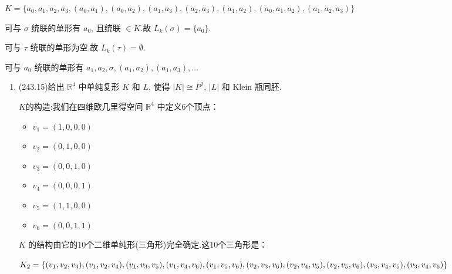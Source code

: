 \begin{enumerate}
\begin{proofc}[解答]
\begin{itemize}
    $K = \{ a_0, a_1, a_2, a_3, (a_0, a_1), (a_0, a_2), (a_1, a_3), (a_2, a_3), (a_1, a_2), (a_0, a_1, a_2), (a_1, a_2, a_3) \}$
    
    可与 $\sigma$ 统联的单形有 $a_0$, 且统联 $\in K$.故 $L_k(\sigma) = \{a_0\}$.
    
    可与 $\tau$ 统联的单形为空.故 $L_k(\tau) = \emptyset$.
    
    可与 $a_0$ 统联的单形有 $a_1, a_2, \sigma, (a_1, a_2), (a_1, a_3), \dots$\qedhere
\end{itemize}

\end{proofc}
\end{enumerate}

\begin{enumerate}
\item(243.15)给出 $\mathbb{R}^4$ 中单纯复形 $K$ 和 $L$, 使得 $|K| \cong P^2$, $|L|$ 和 Klein 瓶同胚.

\begin{proofc}[解答]
$K$的构造:我们在四维欧几里得空间 $\mathbb{R}^4$ 中定义6个顶点：\par
\begin{itemize}
    \item $v_1 = (1, 0, 0, 0)$
    \item $v_2 = (0, 1, 0, 0)$
    \item $v_3 = (0, 0, 1, 0)$
    \item $v_4 = (0, 0, 0, 1)$
    \item $v_5 = (1, 1, 0, 0)$
    \item $v_6 = (0, 0, 1, 1)$
\end{itemize}
$K$ 的结构由它的10个二维单纯形(三角形)完全确定.这10个三角形是：

$K_2 =\{
(v_1, v_2, v_3),  (v_1, v_2, v_4),  (v_1, v_3, v_5),  (v_1, v_4, v_6),  (v_1, v_5, v_6), \\
(v_2, v_3, v_6),  (v_2, v_4, v_5),  (v_2, v_5, v_6),  (v_3, v_4, v_5),  (v_3, v_4, v_6)
\}$



\end{proofc}
\end{enumerate}
